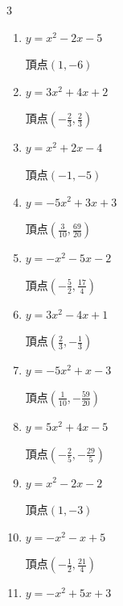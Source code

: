 \begin{multicols}{3}
\begin{enumerate}
        $\displaystyle 頂点\left( -\frac{5}{4} , \frac{57}{8} \right)$

\columnbreak %

  \item $\displaystyle y=x^{2}-2x-5$

        $\displaystyle 頂点\left( 1 , -6 \right)$

  \item $\displaystyle y=3x^{2}+4x+2$

        $\displaystyle 頂点\left( -\frac{2}{3} , \frac{2}{3} \right)$

  \item $\displaystyle y=x^{2}+2x-4$

        $\displaystyle 頂点\left( -1 , -5 \right)$

  \item $\displaystyle y=-5x^{2}+3x+3$

        $\displaystyle 頂点\left( \frac{3}{10} , \frac{69}{20} \right)$

  \item $\displaystyle y=-x^{2}-5x-2$

        $\displaystyle 頂点\left( -\frac{5}{2} , \frac{17}{4} \right)$

\columnbreak %

\resetques

  \item $\displaystyle y=3x^{2}-4x+1$

        $\displaystyle 頂点\left( \frac{2}{3} , -\frac{1}{3} \right)$

  \item $\displaystyle y=-5x^{2}+x-3$

        $\displaystyle 頂点\left( \frac{1}{10} , -\frac{59}{20} \right)$

  \item $\displaystyle y=5x^{2}+4x-5$

        $\displaystyle 頂点\left( -\frac{2}{5} , -\frac{29}{5} \right)$

  \item $\displaystyle y=x^{2}-2x-2$

        $\displaystyle 頂点\left( 1 , -3 \right)$

  \item $\displaystyle y=-x^{2}-x+5$

        $\displaystyle 頂点\left( -\frac{1}{2} , \frac{21}{4} \right)$

\columnbreak %

  \item $\displaystyle y=-x^{2}+5x+3$


\end{enumerate}
\end{multicols}
